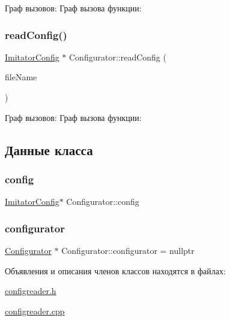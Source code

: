 Граф вызовов\+:
Граф вызова функции\+:
\mbox{\label{class_configurator_a400f7c5c3362fcab86051b014e894544}} 
\subsubsection{\texorpdfstring{read\+Config()}{readConfig()}}
{\footnotesize\ttfamily \hyperlink{class_imitator_config}{Imitator\+Config} $\ast$ Configurator\+::read\+Config (\begin{DoxyParamCaption}\item[{Q\+String}]{file\+Name }\end{DoxyParamCaption})}

Граф вызовов\+:
Граф вызова функции\+:


\subsection{Данные класса}
\mbox{\label{class_configurator_ab443cd9fb6f7abff1c05f76689ae469a}} 
\subsubsection{\texorpdfstring{config}{config}}
{\footnotesize\ttfamily \hyperlink{class_imitator_config}{Imitator\+Config}$\ast$ Configurator\+::config}

\mbox{\label{class_configurator_a7ec0953cb82dd1ac0c9e0cf358a9ad8c}} 
\subsubsection{\texorpdfstring{configurator}{configurator}}
{\footnotesize\ttfamily \hyperlink{class_configurator}{Configurator} $\ast$ Configurator\+::configurator = nullptr\hspace{0.3cm}{\ttfamily [static]}}



Объявления и описания членов классов находятся в файлах\+:\begin{DoxyCompactItemize}
\item 
\hyperlink{configreader_8h}{configreader.\+h}\item 
\hyperlink{configreader_8cpp}{configreader.\+cpp}\end{DoxyCompactItemize}
